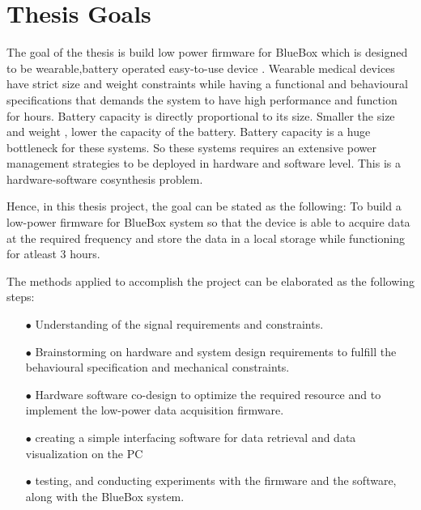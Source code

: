 \section{Thesis Goals}
The goal of the thesis is build low power firmware for BlueBox which is designed to be wearable,battery operated easy-to-use device . Wearable medical devices have strict size and weight constraints while having a functional and behavioural specifications that demands the system to have high performance and function for hours. Battery capacity is directly proportional to its size. Smaller the size and weight , lower the capacity of the battery\cite{}. Battery capacity is a huge bottleneck for these systems. So these systems requires an extensive power management strategies to be deployed in hardware and software level. This is a hardware-software cosynthesis problem.

Hence, in this thesis project, the goal can be stated as the following:
 To build a low-power firmware for BlueBox system so that the device is able to acquire data at the required frequency and store the data in a local storage while functioning for atleast 3 hours. 
 
 The methods applied to accomplish the project can be elaborated as the following steps:
 \begin{itemize}
 	\item[$\bullet$] Understanding of the signal requirements and constraints. 
 	
 	\item[$\bullet$] Brainstorming on hardware and system design requirements to fulfill the behavioural specification and  mechanical constraints.
 	
 	\item[$\bullet$] Hardware software co-design to optimize the required resource and to implement the low-power data acquisition firmware.
 	
 	\item[$\bullet$] creating a simple interfacing software for data retrieval and data visualization on the PC
 	
 	\item[$\bullet$] testing, and conducting experiments with the firmware and the software,
 	along with the BlueBox system.
 \end{itemize}
 
